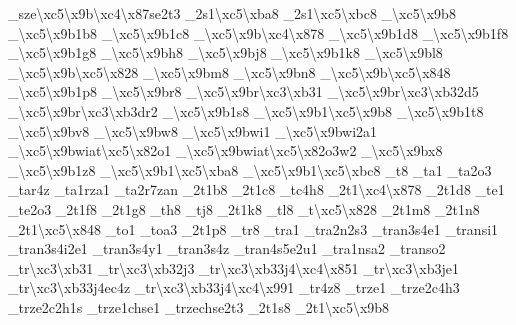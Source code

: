 \begin{DoxyCompactItemize}
\-\_\-sze\textbackslash{}xc5\textbackslash{}x9b\textbackslash{}xc4\textbackslash{}x87se2t3 \-\_\-2s1\textbackslash{}xc5\textbackslash{}xba8 \-\_\-2s1\textbackslash{}xc5\textbackslash{}xbc8 \-\_\-\textbackslash{}xc5\textbackslash{}x9b8 \-\_\textbackslash{}xc5\textbackslash{}x9b1b8 \-\_\-\textbackslash{}xc5\textbackslash{}x9b1c8 \-\_\-\textbackslash{}xc5\textbackslash{}x9b\textbackslash{}xc4\textbackslash{}x878 \-\_\textbackslash{}xc5\textbackslash{}x9b1d8 \-\_\textbackslash{}xc5\textbackslash{}x9b1f8 \-\_\textbackslash{}xc5\textbackslash{}x9b1g8 \-\_\-\textbackslash{}xc5\textbackslash{}x9bh8 \-\_\-\textbackslash{}xc5\textbackslash{}x9bj8 \-\_\textbackslash{}xc5\textbackslash{}x9b1k8 \-\_\-\textbackslash{}xc5\textbackslash{}x9bl8 \-\_\-\textbackslash{}xc5\textbackslash{}x9b\textbackslash{}xc5\textbackslash{}x828 \-\_\-\textbackslash{}xc5\textbackslash{}x9bm8 \-\_\-\textbackslash{}xc5\textbackslash{}x9bn8 \-\_\-\textbackslash{}xc5\textbackslash{}x9b\textbackslash{}xc5\textbackslash{}x848 \-\_\textbackslash{}xc5\textbackslash{}x9b1p8 \-\_\-\textbackslash{}xc5\textbackslash{}x9br8 \-\_\-\textbackslash{}xc5\textbackslash{}x9br\textbackslash{}xc3\textbackslash{}xb31 \-\_\-\textbackslash{}xc5\textbackslash{}x9br\textbackslash{}xc3\textbackslash{}xb32d5 \-\_\-\textbackslash{}xc5\textbackslash{}x9br\textbackslash{}xc3\textbackslash{}xb3dr2 \-\_\textbackslash{}xc5\textbackslash{}x9b1s8 \-\_\textbackslash{}xc5\textbackslash{}x9b1\textbackslash{}xc5\textbackslash{}x9b8 \-\_\textbackslash{}xc5\textbackslash{}x9b1t8 \-\_\-\textbackslash{}xc5\textbackslash{}x9bv8 \-\_\-\textbackslash{}xc5\textbackslash{}x9bw8 \-\_\-\textbackslash{}xc5\textbackslash{}x9bwi1 \-\_\-\textbackslash{}xc5\textbackslash{}x9bwi2a1 \-\_\-\textbackslash{}xc5\textbackslash{}x9bwiat\textbackslash{}xc5\textbackslash{}x82o1 \-\_\-\textbackslash{}xc5\textbackslash{}x9bwiat\textbackslash{}xc5\textbackslash{}x82o3w2 \-\_\-\textbackslash{}xc5\textbackslash{}x9bx8 \-\_\textbackslash{}xc5\textbackslash{}x9b1z8 \-\_\textbackslash{}xc5\textbackslash{}x9b1\textbackslash{}xc5\textbackslash{}xba8 \-\_\textbackslash{}xc5\textbackslash{}x9b1\textbackslash{}xc5\textbackslash{}xbc8 \-\_\-t8 \-\_\-ta1 \-\_\-ta2o3 \-\_\-tar4z \-\_\-ta1rza1 \-\_\-ta2r7zan \-\_\-2t1b8 \-\_\-2t1c8 \-\_\-tc4h8 \-\_\-2t1\textbackslash{}xc4\textbackslash{}x878 \-\_\-2t1d8 \-\_\-te1 \-\_\-te2o3 \-\_\-2t1f8 \-\_\-2t1g8 \-\_\-th8 \-\_\-tj8 \-\_\-2t1k8 \-\_\-tl8 \-\_\-t\textbackslash{}xc5\textbackslash{}x828 \-\_\-2t1m8 \-\_\-2t1n8 \-\_\-2t1\textbackslash{}xc5\textbackslash{}x848 \-\_\-to1 \-\_\-toa3 \-\_\-2t1p8 \-\_\-tr8 \-\_\-tra1 \-\_\-tra2n2s3 \-\_\-tran3s4e1 \-\_\-transi1 \-\_\-tran3s4i2e1 \-\_\-tran3s4y1 \-\_\-tran3s4z \-\_\-tran4s5e2u1 \-\_\-tra1nsa2 \-\_\-transo2 \-\_\-tr\textbackslash{}xc3\textbackslash{}xb31 \-\_\-tr\textbackslash{}xc3\textbackslash{}xb32j3 \-\_\-tr\textbackslash{}xc3\textbackslash{}xb33j4\textbackslash{}xc4\textbackslash{}x851 \-\_\-tr\textbackslash{}xc3\textbackslash{}xb3je1 \-\_\-tr\textbackslash{}xc3\textbackslash{}xb33j4ec4z \-\_\-tr\textbackslash{}xc3\textbackslash{}xb33j4\textbackslash{}xc4\textbackslash{}x991 \-\_\-tr4z8 \-\_\-trze1 \-\_\-trze2c4h3 \-\_\-trze2c2h1s \-\_\-trze1chse1 \-\_\-trzechse2t3 \-\_\-2t1s8 \-\_\-2t1\textbackslash{}xc5\textbackslash{}x9b8 
\end{DoxyCompactItemize}
